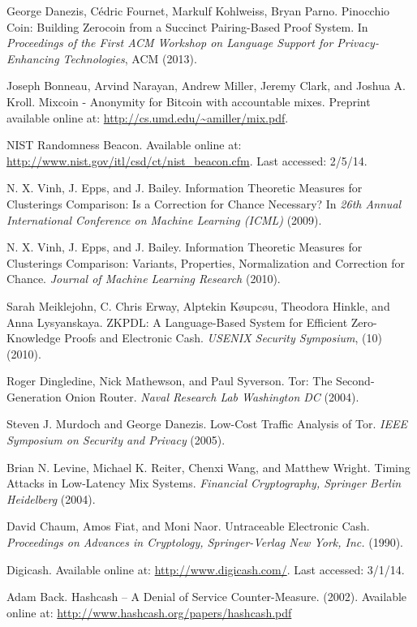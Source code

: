 \documentclass[conference]{IEEEtran}
\begin{document}
\begin{thebibliography}{1}
 George Danezis, C\'{e}dric Fournet, Markulf Kohlweiss, Bryan Parno. Pinocchio Coin: Building Zerocoin from a Succinct Pairing-Based Proof System. In \emph{Proceedings of the First ACM Workshop on Language Support for Privacy-Enhancing Technologies}, ACM (2013).

 Joseph Bonneau, Arvind Narayan, Andrew Miller, Jeremy Clark, and Joshua A. Kroll. Mixcoin - Anonymity for Bitcoin with accountable mixes. Preprint available online at: \url{http://cs.umd.edu/~amiller/mix.pdf}.

 NIST Randomness Beacon. Available online at: \url{http://www.nist.gov/itl/csd/ct/nist_beacon.cfm}. Last accessed: 2/5/14.

 N. X. Vinh, J. Epps, and J. Bailey. Information Theoretic Measures for Clusterings Comparison: Is a Correction for Chance Necessary? In \emph{26th Annual International Conference on Machine Learning (ICML)} (2009).

 N. X. Vinh, J. Epps, and J. Bailey. Information Theoretic Measures for Clusterings Comparison: Variants, Properties, Normalization and Correction for Chance. \emph{Journal of Machine Learning Research} (2010).

 Sarah Meiklejohn, C. Chris Erway, Alptekin K\o{u}pc\o{u}, Theodora Hinkle, and Anna Lysyanskaya. ZKPDL: A Language-Based System for Efficient Zero-Knowledge Proofs and Electronic Cash. \emph{USENIX Security Symposium}, (10) (2010).

 Roger Dingledine, Nick Mathewson, and Paul Syverson. Tor: The Second-Generation Onion Router. \emph{Naval Research Lab Washington DC} (2004).

 Steven J. Murdoch and George Danezis. Low-Cost Traffic Analysis of Tor. \emph{IEEE Symposium on Security and Privacy} (2005).

 Brian N. Levine, Michael K. Reiter, Chenxi Wang, and Matthew Wright. Timing Attacks in Low-Latency Mix Systems. \emph{Financial Cryptography, Springer Berlin Heidelberg} (2004).

 David Chaum, Amos Fiat, and Moni Naor. Untraceable Electronic Cash. \emph{Proceedings on Advances in Cryptology, Springer-Verlag New York, Inc.} (1990).

 Digicash. Available online at: \url{http://www.digicash.com/}. Last accessed: 3/1/14.

 Adam Back. Hashcash – A Denial of Service Counter-Measure. (2002). Available online at: \url{http://www.hashcash.org/papers/hashcash.pdf}


\end{thebibliography}
\end{document}
